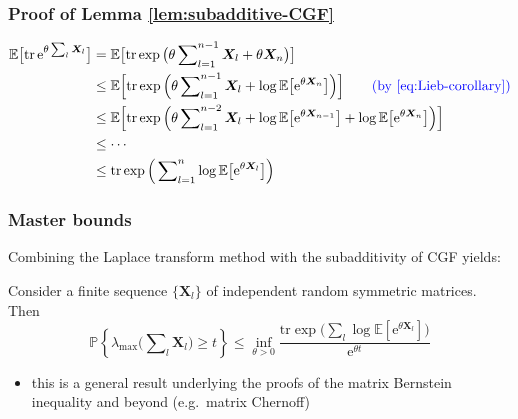 \documentclass[compress,
mathserif,wide,%
]{beamer}
\begin{document}
\begin{frame}
\frametitle{Proof of Lemma \ref{lem:subadditive-CGF}}  


\begin{align*}
\mathbb{E}\big[\mathrm{tr}\,\mathrm{e}^{\theta\sum_{l}\bm{X}_{l}}\big] & =\mathbb{E}\big[\mathrm{tr}\exp\big(\theta\sum\nolimits _{l=1}^{n-1}\bm{X}_{l}+\theta\bm{X}_{n}\big)\big]\\
	& \leq\mathbb{E}\Big[\mathrm{tr}\exp\Big(\theta\sum\nolimits _{l=1}^{n-1}\bm{X}_{l}+\log\mathbb{E}\big[ \mathrm{e}^{\theta\bm{X}_{n}} \big]\Big)\Big] \qquad \textcolor{blue}{ (\text{by }\eqref{eq:Lieb-corollary})}\\
 	& \leq\mathbb{E}\Big[\mathrm{tr}\exp\Big(\theta\sum\nolimits _{l=1}^{n-2}\bm{X}_{l}+\log\mathbb{E}\big[ \mathrm{e}^{\theta\bm{X}_{n-1}} \big]+\log\mathbb{E}\big[\mathrm{e}^{\theta\bm{X}_{n}}\big]\Big)\Big]\\
 	& \leq\cdots\\
 	& \leq\mathrm{tr}\exp\Big(\sum\nolimits _{l=1}^{n}\log\mathbb{E}\big[\mathrm{e}^{\theta\bm{X}_{l}}\big]\Big)
\end{align*}


\end{frame}



\begin{frame}
\frametitle{Master bounds}  


Combining the Laplace transform method with the subadditivity of CGF yields:

\bigskip

\begin{theorem}
	\label{thm:master-bounds}
	Consider a finite sequence $\{\bm{X}_l\}$ of independent random symmetric matrices. Then 
	\vspace{-0.5em}
	\[
		\mathbb{P}\left\{ \lambda_{\max}\big(\sum\nolimits _{l}\bm{X}_{l}\big)\geq t\right\} \leq\inf_{\theta>0}\frac{\mathrm{tr}\exp\big(\sum\nolimits _{l}\log\mathbb{E}[\mathrm{e}^{\theta\bm{X}_{l}}]\big)}{\mathrm{e}^{\theta t}}
	\]
\end{theorem}

\begin{itemize}
	\item this is a general result underlying the proofs of the matrix Bernstein inequality and beyond (e.g.~matrix Chernoff)
\end{itemize}


\end{frame}
\end{document}
